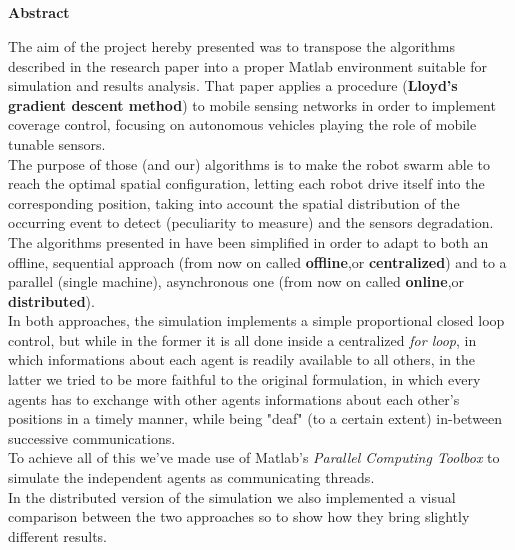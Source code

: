 \documentclass[a4paper,11pt,oneside]{book}
\begin{document}
	
	\newpage
	\thispagestyle{empty}
	
	
	
	\begin{center}
		\chapter*{}
		\thispagestyle{empty}
		{\Huge \textbf{Abstract}}\\
		\vspace{15mm}
	\end{center}
		The aim of the project hereby presented was to transpose the algorithms described in the research paper\cite{K1} into a proper Matlab environment suitable for simulation and results analysis. That paper applies a procedure (\textbf{Lloyd's gradient descent method}) to mobile sensing networks in order to implement coverage control, focusing on autonomous vehicles playing the role of mobile tunable sensors.\\ 
	The purpose of those (and our) algorithms is to make the robot swarm able to reach the optimal spatial configuration, letting each robot drive itself into the corresponding position, taking into account the spatial distribution of the occurring event to detect (peculiarity to measure) and the sensors degradation.\\
	The algorithms presented in \cite{K1} have been simplified in order to adapt to both an offline, sequential approach (from now on called \textbf{offline},or \textbf{centralized}) and to a parallel (single machine), asynchronous one (from now on called \textbf{online},or \textbf{distributed}).\\
	In both approaches, the simulation implements a simple proportional closed loop control, but while in the former it is all done inside a centralized \textit{for loop}, in which informations about each agent is readily available to all others, in the latter we tried to be more faithful to the original formulation, in which every agents has to exchange with other agents informations about each other's positions in a timely manner, while being "deaf" (to a certain extent) in-between successive communications.\\
	To achieve all of this we've made use of Matlab's \textit{Parallel Computing Toolbox} to simulate the independent agents as communicating threads.\\
	In the distributed version of the simulation we also implemented a visual comparison between the two approaches so to show how they bring slightly different results.
	
\end{document}
